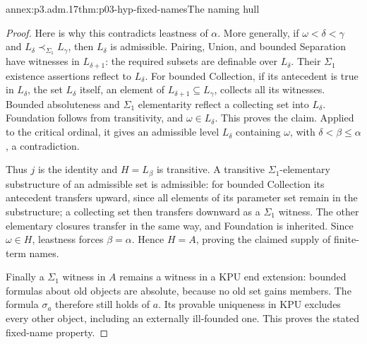 \begin{annexitem}{annex:p3.adm.17}{thm:p03-hyp-fixed-names}{The naming hull}
\begin{proof}
Here is why this contradicts leastness of \(\alpha\). More generally,
if \(\omega<\delta<\gamma\) and
\(L_\delta\prec_{\Sigma_1}L_\gamma\), then \(L_\delta\) is
admissible. Pairing, Union, and bounded Separation have witnesses in
\(L_{\delta+1}\): the required subsets are definable over
\(L_\delta\). Their \(\Sigma_1\) existence assertions reflect
to \(L_\delta\). For bounded Collection, if its antecedent is true
in \(L_\delta\), the set \(L_\delta\) itself, an element of
\(L_{\delta+1}\subseteq L_\gamma\), collects all its witnesses.
Bounded absoluteness and \(\Sigma_1\) elementarity reflect a
collecting set into \(L_\delta\). Foundation follows from
transitivity, and \(\omega\in L_\delta\). This proves the claim.
Applied to the critical ordinal, it gives an admissible level
\(L_\delta\) containing \(\omega\), with
\(\delta<\beta\leq\alpha\), a contradiction.

Thus \(j\) is the identity and \(H=L_\beta\) is transitive.
A transitive \(\Sigma_1\)-elementary substructure of an admissible
set is admissible: for bounded Collection its antecedent transfers
upward, since all elements of its parameter set remain in the
substructure; a collecting set then transfers downward as a
\(\Sigma_1\) witness. The other elementary closures transfer in
the same way, and Foundation is inherited. Since \(\omega\in H\),
leastness forces \(\beta=\alpha\). Hence \(H=A\), proving the
claimed supply of finite-term names.

Finally a \(\Sigma_1\) witness in \(A\) remains a witness in a KPU
end extension: bounded formulas about old objects are absolute, because
no old set gains members. The formula \(\sigma_a\) therefore still
holds of \(a\). Its provable uniqueness in KPU excludes every other
object, including an externally ill-founded one. This proves the
stated fixed-name property.
\end{proof}
\end{annexitem}
